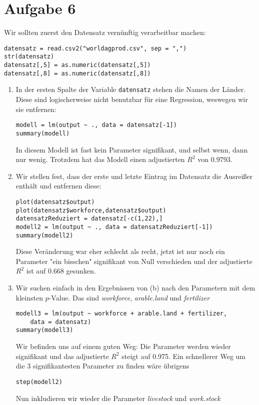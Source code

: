 \documentclass{article}
\begin{document}
	\section*{Aufgabe 6}
	Wir sollten zuerst den Datensatz vernünftig verarbeitbar machen:
	\begin{lstlisting}[style=R]
datensatz = read.csv2("worldagprod.csv", sep = ",")
str(datensatz)
datensatz[,5] = as.numeric(datensatz[,5])
datensatz[,8] = as.numeric(datensatz[,8])
	\end{lstlisting}
	\begin{enumerate}[label=(\alph*)]
		\item In der ersten Spalte der Variable \texttt{datensatz} stehen die Namen der Länder. Diese sind logischerweise nicht benutzbar für eine Regression, weswegen wir sie entfernen:
		\begin{lstlisting}[style=R]
modell = lm(output ~ ., data = datensatz[-1])
summary(modell)
		\end{lstlisting}
		In diesem Modell ist fast kein Parameter signifikant, und selbst wenn, dann nur wenig. Trotzdem hat das Modell einen adjustierten $R^2$ von 0.9793.
		\item Wir stellen fest, dass der erste und letzte Eintrag im Datensatz die Ausreißer enthält und entfernen diese:
		\begin{lstlisting}[style=R]
plot(datensatz$output)
plot(datensatz$workforce,datensatz$output)
datensatzReduziert = datensatz[-c(1,22),]
modell2 = lm(output ~ ., data = datensatzReduziert[-1])
summary(modell2)
		\end{lstlisting}
		Diese Veränderung war eher schlecht als recht, jetzt ist nur noch ein Parameter "ein bisschen" signifikant von Null verschieden und der adjustierte $R^2$ ist auf 0.668 gesunken.
		\item Wir suchen einfach in den Ergebnissen von (b) nach den Parametern mit dem kleinsten $p$-Value. Das sind \textit{workforce}, \textit{arable.land} und \textit{fertilizer}
		\begin{lstlisting}[style=R]
modell3 = lm(output ~ workforce + arable.land + fertilizer, 
	data = datensatz)
summary(modell3)
		\end{lstlisting}
		Wir befinden uns auf einem guten Weg: Die Parameter werden wieder signifikant und das adjustierte $R^2$ steigt auf 0.975. Ein schnellerer Weg um die 3 signifikantesten Parameter zu finden wäre übrigens
		\begin{lstlisting}[style=R]
step(modell2)
		\end{lstlisting}
		Nun inkludieren wir wieder die Parameter \textit{livestock} und \textit{work.stock}

\end{enumerate}
\end{document}
